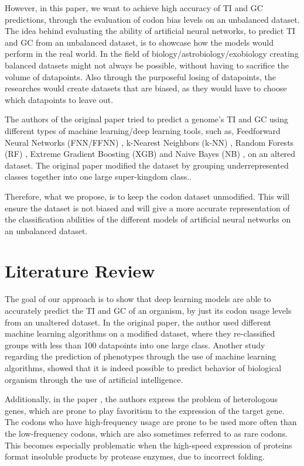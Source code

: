 \documentclass[conference]{IEEEtran}
\begin{document}
However, in this paper, we want to achieve high accuracy of TI and GC predictions, through the evaluation of codon bias levels on an unbalanced dataset. The idea behind evaluating the ability of artificial neural networks, to predict TI and GC from an unbalanced dataset, is to showcase how the models would perform in the real world. In the field of biology/astrobiology/exobiology creating balanced datasets might not always be possible, without having to sacrifice the volume of datapoints\cite{Mehrabi}. Also through the purposeful losing of datapoints, the researches would create datasets that are biased, as they would have to choose which datapoints to leave out. 

The authors of the original paper tried to predict a genome's TI and GC using different types of machine learning/deep learning tools, such as, Feedforward Neural Networks (FNN/FFNN) \cite{Krenker}, k-Nearest Neighbors (k-NN) \cite{Cunningham}, Random Forests (RF) \cite{Breiman}, Extreme Gradient Boosting (XGB)\cite{Chen} and Naive Bayes (NB) \cite{Mitchell}, on an altered dataset. The original paper modified the dataset by grouping underrepresented classes together into one large super-kingdom class.. 

Therefore, what we propose, is to keep the codon dataset unmodified. This will ensure the dataset is not biased and will give a more accurate representation of the classification abilities of the different models of artificial neural networks on an unbalanced dataset. 


\section{Literature Review}
The goal of our approach is to show that deep learning models are able to accurately predict the TI and GC of an organism, by just its codon usage levels from an unaltered dataset. In the original paper, the author used different machine learning algorithms on a modified dataset\cite{Zhu}, where they re-classified groups with less than 100 datapoints into one large class. Another study regarding the prediction of phenotypes through the use of machine learning algorithms\cite{Grinberg}, showed that it is indeed possible to predict behavior of biological organism through the use of artificial intelligence. 

Additionally, in the paper \cite{Tian}, the authors express the problem of heterologous genes, which are prone to play favoritism to the expression of the target gene. The codons who have high-frequency usage are prone to be used more often than the low-frequency codons, which are also sometimes referred to as rare codons. This becomes especially problematic when the high-speed expression of proteins format insoluble products by protease enzymes, due to incorrect folding\cite{Hurley}.
\end{document}
